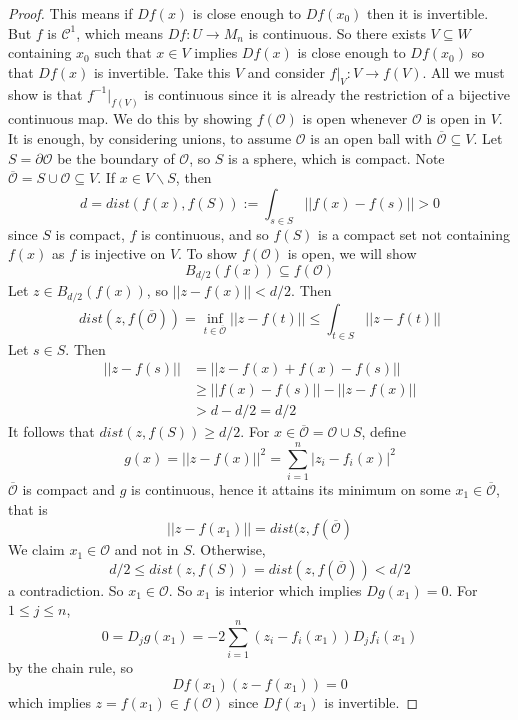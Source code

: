 \begin{proof}
    This means if $Df(x)$ is close enough to $Df(x_0)$ then it is invertible. But $f$ is $\mathcal{C}^1$, which means $Df:U\rightarrow M_n$ is continuous. So there exists $V \subseteq W$ containing $x_0$ such that $x \in V$ implies $Df(x)$ is close enough to $Df(x_0)$ so that $Df(x)$ is invertible. Take this $V$ and consider $f\vert_V:V\rightarrow f(V)$. All we must show is that $f^{-1}\vert_{f(V)}$ is continuous since it is already the restriction of a bijective continuous map. We do this by showing $f(\mathcal{O})$ is open whenever $\mathcal{O}$ is open in $V$. It is enough, by considering unions, to assume $\mathcal{O}$ is an open ball with $\overline{\mathcal{O}} \subseteq V$. Let $S = \partial \mathcal{O}$ be the boundary of $\mathcal{O}$, so $S$ is a sphere, which is compact. Note $\overline{\mathcal{O}} = S\cup \mathcal{O} \subseteq V$. If $x \in V\backslash S$, then $$d = dist(f(x),f(S)) := \int_{s \in S}||f(x)-f(s)|| > 0$$ since $S$ is compact, $f$ is continuous, and so $f(S)$ is a compact set not containing $f(x)$ as $f$ is injective on $V$. To show $f(\mathcal{O})$ is open, we will show $$B_{d/2}(f(x)) \subseteq f(\mathcal{O})$$ Let $z \in B_{d/2}(f(x))$, so $||z-f(x)|| < d/2$. Then $$dist(z,f(\overline{\mathcal{O}})) = \inf_{t\in\overline{\mathcal{O}}}||z-f(t)|| \leq \int_{t \in S}||z-f(t)||$$ Let $s \in S$. Then \begin{align*}
        ||z-f(s)|| &= ||z-f(x) + f(x) - f(s)|| \\
        &\geq ||f(x) - f(s)|| - ||z-f(x)|| \\
        &> d - d/2 = d/2
    \end{align*}
    It follows that $dist(z,f(S)) \geq d/2$. For $x \in \overline{\mathcal{O}} = \mathcal{O}\cup S$, define $$g(x) = ||z-f(x)||^2 = \sum_{i=1}^n|z_i-f_i(x)|^2$$ $\overline{\mathcal{O}}$ is compact and $g$ is continuous, hence it attains its minimum on some $x_1 \in \overline{\mathcal{O}}$, that is $$||z-f(x_1)|| = dist(z,f(\overline{\mathcal{O}})$$ We claim $x_1 \in \mathcal{O}$ and not in $S$. Otherwise, $$d/2 \leq dist(z,f(S)) = dist(z,f(\overline{\mathcal{O}})) < d/2$$ a contradiction. So $x_1 \in \mathcal{O}$. So $x_1$ is interior which implies $Dg(x_1) = 0$. For $1 \leq j \leq n$, $$0 = D_jg(x_1) = -2\sum_{i=1}^n(z_i-f_i(x_1))D_jf_i(x_1)$$ by the chain rule, so $$Df(x_1)(z-f(x_1)) = 0$$ which implies $z = f(x_1) \in f(\mathcal{O})$ since $Df(x_1)$ is invertible.
\end{proof}

